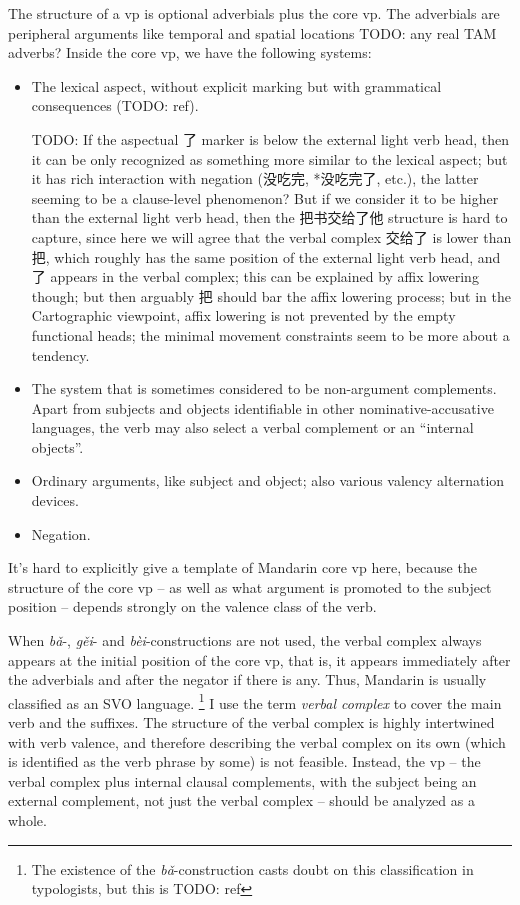 \documentclass[UTF8, a4paper, oneside, scheme=plain, 12pt]{ctexrep}
\newcommand*{\term}[1]{\emph{#1}}
\newcommand{\form}[1]{\emph{#1}}
\begin{document}
The structure of a \acs{vp} is 
optional adverbials
plus the core \acs{vp}.
The adverbials are peripheral arguments like 
temporal and spatial locations TODO: any real TAM adverbs? 
Inside the core \acs{vp},
we have the following systems:
\begin{itemize}
    \item The lexical aspect, without explicit marking but with grammatical consequences (TODO: ref).
        
    TODO: If the aspectual 了 marker is below the external light verb head, 
    then it can be only recognized as something more similar to the lexical aspect; 
    but it has rich interaction with negation (没吃完, *没吃完了, etc.),
    the latter seeming to be a clause-level phenomenon?
    But if we consider it to be higher than the external light verb head, 
    then the 把书交给了他 structure is hard to capture,
    since here we will agree that the verbal complex 交给了 
    is lower than 把, which roughly has the same position of the external light verb head,
    and 了 appears in the verbal complex; 
    this can be explained by affix lowering though; 
    but then arguably 把 should bar the affix lowering process; 
    but in the Cartographic viewpoint, 
    affix lowering is not prevented by the empty functional heads; 
    the minimal movement constraints seem to be more about a tendency. 

    \item The system that is sometimes considered to be non-argument complements.
    Apart from subjects and objects 
    identifiable in other nominative-accusative languages,
    the verb may also select 
    a verbal complement or an ``internal objects''.
    \item Ordinary arguments, like subject and object; 
        also various valency alternation devices.
    \item Negation. 
\end{itemize} 

It's hard to explicitly give a template of Mandarin core \acs{vp} here,
because the structure of the core \acs{vp} 
-- as well as what argument is promoted to the subject position -- depends
strongly on the valence class of the verb.

When \form{bǎ}-, \form{gěi}- and \form{bèi}-constructions are not used,
the verbal complex always appears at the initial position 
of the core \acs{vp}, 
that is, it appears immediately after the adverbials 
and after the negator if there is any. 
Thus, Mandarin is usually classified as an SVO language.%
\footnote{
    The existence of the \form{bǎ}-construction
    casts doubt on this classification in typologists, 
    but this is TODO: ref
}
I use the term \term{verbal complex} to cover 
the main verb and the suffixes.
The structure of the verbal complex is highly intertwined 
with verb valence, 
and therefore describing the verbal complex on its own 
(which is identified as the verb phrase by some)
is not feasible.
Instead, the \acs{vp} 
-- the verbal complex plus internal clausal complements, 
with the subject being an external complement,
not just the verbal complex --
should be analyzed as a whole.
\end{document}
